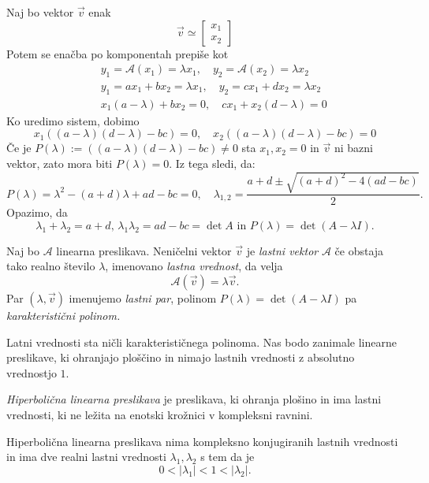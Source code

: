 \documentclass[GmVic, tisk]{gv}
\begin{document}
%
Naj bo vektor $\vec v$ enak
$$\vec v \simeq \begin{bmatrix}
         x_1\\
         x_2
      \end{bmatrix}
$$
Potem se enačba po komponentah prepiše kot
\begin{eqnarray*}
&&y_1= \mathcal A(x_1)=\lambda x_1, \quad y_2= \mathcal A(x_2)=\lambda x_2\\
&&y_1 = ax_1+bx_2 = \lambda x_1, \quad y_2 = cx_1+dx_2 = \lambda x_2\\
&&x_1(a-\lambda)+bx_2 =0, \quad cx_1+x_2(d - \lambda)=0
\end{eqnarray*}
Ko uredimo sistem, dobimo
\[x_1((a-\lambda)(d-\lambda)-bc)=0, \quad
x_2((a-\lambda)(d-\lambda)-bc)=0
\]
Če je $P(\lambda):=((a-\lambda)(d-\lambda)-bc) \ne 0$ sta $x_1,x_2=0$ in $\vec v$ ni bazni vektor, zato mora biti $P(\lambda)=0$.
Iz tega sledi, da:
$$
P(\lambda)=\lambda^2-(a+d)\lambda +ad -bc=0,  \quad
\lambda_{1,2}= \frac{a+d \pm \sqrt{(a+d)^2-4(ad-bc)}}{2}.
$$
Opazimo, da 
$$
\lambda_1+\lambda_2= a+d, \, \lambda_1\lambda_2= ad-bc=\det A \mbox{ in } P(\lambda)=\det(A-\lambda I).
$$
%
\begin{definicija} Naj bo $\mathcal A$ linearna preslikava. Neničelni vektor ${\vec v}$ je {\em lastni vektor} ${\mathcal A}$ če obstaja tako realno število $\lambda$, imenovano {\em lastna vrednost}, da velja 
$$
\mathcal A(\vec v)= \lambda \vec v.
$$
Par $(\lambda, \vec v)$ imenujemo {\em lastni par}, polinom $P(\lambda)= \det( A -\lambda I) $  pa {\em karakteristični polinom.}
\end{definicija}
%
Latni vrednosti sta ničli karakterističnega polinoma. Nas bodo zanimale linearne preslikave, ki ohranjajo ploščino in nimajo lastnih vrednosti z absolutno vrednostjo $1$.

\begin{definicija} {\em Hiperbolična linearna preslikava} je preslikava, ki ohranja plošino in  ima lastni vrednosti, ki ne ležita na enotski krožnici v kompleksni ravnini.
\end{definicija}

\begin{trditev} Hiperbolična linearna preslikava nima kompleksno konjugiranih lastnih vrednosti in ima dve realni lastni vrednosti $\lambda_1, \lambda_2$ s tem da je 
$$
0<|\lambda_1|<1 <|\lambda_2|.
$$
\end{trditev}
\end{document}
